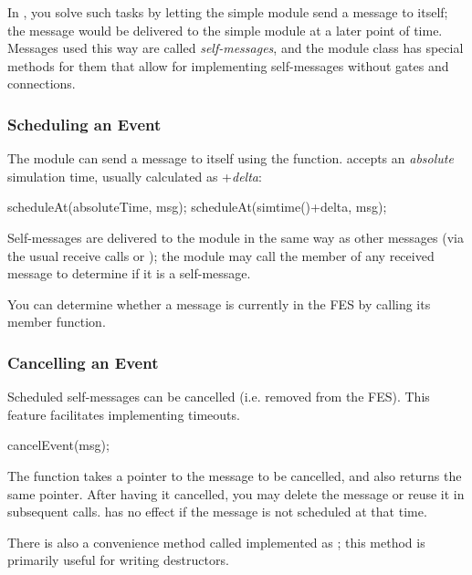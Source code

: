 In {\opp}, you solve such tasks by letting the simple module send a message
to itself; the message would be delivered to the simple module at a later
point of time. Messages used this way are called
\textit{self-messages}, and the module class has
special methods for them that allow for implementing self-messages without
gates and connections.

\subsubsection{Scheduling an Event}

The module can send a message to itself using the  function.
 accepts an \textit{absolute} simulation time,
usually calculated as +\textit{delta}:

\begin{cpp}
scheduleAt(absoluteTime, msg);
scheduleAt(simtime()+delta, msg);
\end{cpp}

Self-messages are delivered to the module in the same way as other
messages (via the usual receive calls or );
the module may call the  member of any received
message to determine if it is a self-message.

You can determine whether a message is currently in the FES
by calling its  member function.

\subsubsection{Cancelling an Event}

Scheduled self-messages can be cancelled
 (i.e. removed from the FES).
This feature facilitates implementing timeouts.

\begin{cpp}
cancelEvent(msg);
\end{cpp}

The  function takes a pointer to the message to
be cancelled, and also returns the same pointer. After having it
cancelled, you may delete the message or reuse it in subsequent
 calls.  has no effect if
the message is not scheduled at that time.

There is also a convenience method called 
implemented as ;
this method is primarily useful for writing destructors.

